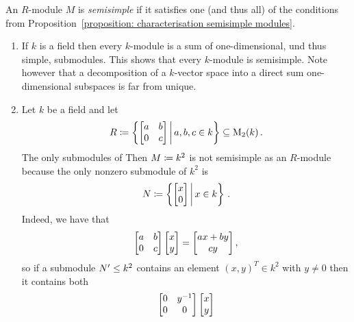 \begin{definition}
  An $R$-module $M$ is \emph{semisimple} if it satisfies one (and thus all) of the conditions from Proposition~\ref{proposition: characterisation semisimple modules}.
\end{definition}


\begin{example}
  \label{example: semisimple modules}
  \leavevmode
  \begin{enumerate}
    \item
      \label{enumerate: vector spaces are semisimple}
      If $k$ is a field then every $k$-module is a sum of one-dimensional, und thus simple, submodules.
      This shows that every $k$-module is semisimple.
      Note however that a decomposition of a $k$-vector space into a direct sum one-dimensional subspaces is far from unique.
    \item
      Let $k$ be a field and let
      \[
                  R
        \defined  \left\{
                    \begin{bmatrix}
                      a & b \\
                      0 & c
                    \end{bmatrix}
                    \suchthat*
                    a, b, c \in k
                  \right\}
        \subseteq \Mat_2(k) \,.
      \]
      The only submodules of 
      Then $M \coloneqq k^2$ is not semisimple as an $R$-module because the only nonzero submodule of $k^2$ is
      \[
                  N
        \defined  \left\{
                    \vect{x \\ 0}
                  \suchthat*
                    x \in k
                  \right\} \,.
      \]
      Indeed, we have that
      \[
          \begin{bmatrix}
            a & b \\
            0 & c
          \end{bmatrix}
          \begin{bmatrix}x \\ y\end{bmatrix}
        = \begin{bmatrix}ax + by \\ cy\end{bmatrix},
      \]
      so if a submodule $N' \leq k^2$ contains an element $(x,y)^T \in k^2$ with $y \neq 0$ then it contains both
      \begin{align*}
            \begin{bmatrix}
              0 & y^{-1} \\
              0 & 0
            \end{bmatrix}
            \vect{x \\ y}

\end{align*}
\end{enumerate}
\end{example}
